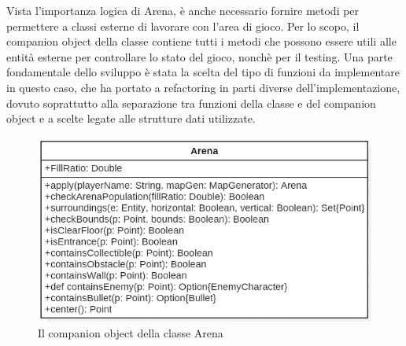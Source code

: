 Vista l'importanza logica di Arena, è anche necessario fornire metodi per permettere a classi esterne di lavorare con l'area di gioco. Per lo scopo, il companion object della classe contiene tutti i metodi che possono essere utili alle entità esterne per controllare lo stato del gioco, nonchè per il testing. Una parte fondamentale dello sviluppo è stata la scelta del tipo di funzioni da implementare in questo caso, che ha portato a refactoring in parti diverse dell'implementazione, dovuto soprattutto alla separazione tra funzioni della classe e del companion object e a scelte legate alle strutture dati utilizzate.
\begin{figure}[H]
  \includegraphics[width=15cm]{res/arenaObject.png}
  \caption{Il companion object della classe Arena}
  \label{arenaObject}
\end{figure}